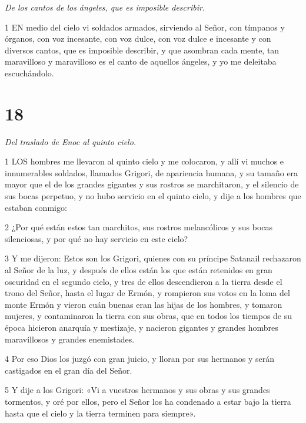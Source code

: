 \par \textit{De los cantos de los ángeles, que es imposible describir.}

\par 1 EN medio del cielo vi soldados armados, sirviendo al Señor, con tímpanos y órganos, con voz incesante, con voz dulce, con voz dulce e incesante y con diversos cantos, que es imposible describir, y que asombran cada mente, tan maravilloso y maravilloso es el canto de aquellos ángeles, y yo me deleitaba escuchándolo.

\chapter{18}

\par \textit{Del traslado de Enoc al quinto cielo.}

\par 1 LOS hombres me llevaron al quinto cielo y me colocaron, y allí vi muchos e innumerables soldados, llamados Grigori, de apariencia humana, y su tamaño era mayor que el de los grandes gigantes y sus rostros se marchitaron, y el silencio de sus bocas perpetuo, y no hubo servicio en el quinto cielo, y dije a los hombres que estaban conmigo:

\par 2 ¿Por qué están estos tan marchitos, sus rostros melancólicos y sus bocas silenciosas, y por qué no hay servicio en este cielo?

\par 3 Y me dijeron: Estos son los Grigori, quienes con su príncipe Satanail rechazaron al Señor de la luz, y después de ellos están los que están retenidos en gran oscuridad en el segundo cielo, y tres de ellos descendieron a la tierra desde el trono del Señor, hasta el lugar de Ermón, y rompieron sus votos en la loma del monte Ermón y vieron cuán buenas eran las hijas de los hombres, y tomaron mujeres, y contaminaron la tierra con sus obras, que en todos los tiempos de su época hicieron anarquía y mestizaje, y nacieron gigantes y grandes hombres maravillosos y grandes enemistades.

\par 4 Por eso Dios los juzgó con gran juicio, y lloran por sus hermanos y serán castigados en el gran día del Señor.

\par 5 Y dije a los Grigori: «Vi a vuestros hermanos y sus obras y sus grandes tormentos, y oré por ellos, pero el Señor los ha condenado a estar bajo la tierra hasta que el cielo y la tierra terminen para siempre».

